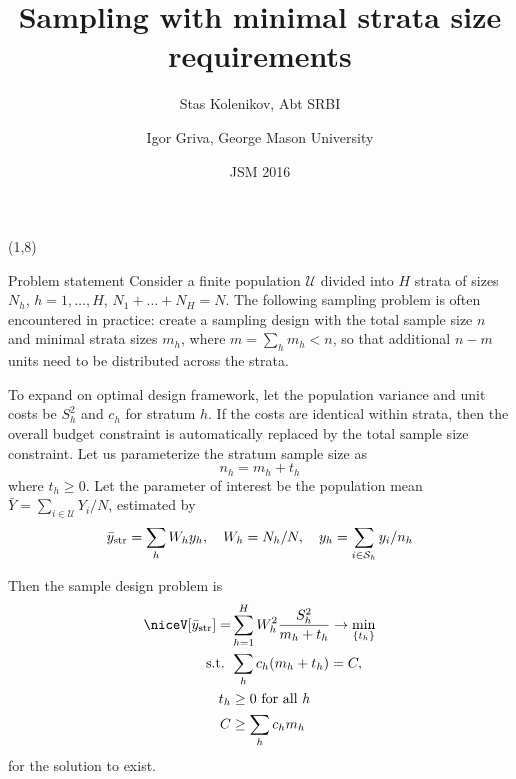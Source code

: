 \documentclass[trans,hyperref={pdfpagelabels=false}]{beamer}
\newcommand{\Var}{\mathop{\niceV}\nolimits}
\begin{document}
\title{Sampling with minimal strata size requirements}

\author{Stas Kolenikov, Abt SRBI
\and
Igor Griva, George Mason University}
\date{JSM 2016}
\institute{}



\begin{frame}{}

\begin{textblock}{26}(1,8)
    \begin{block}{Problem statement}
        \alert<2|trans:0>{
        Consider a finite population $\mathcal U$ divided into $H$ strata
        of sizes $N_h$, $h=1, \ldots, H$, $N_1 + \ldots + N_H = N$.
        The following sampling problem
        is often encountered in practice: create a sampling design
        with the total sample size $n$ and minimal strata sizes $m_h$,
        where $m = \sum_h m_h < n$, so that additional $n-m$ units need to
        be distributed across the strata.}

        \alert<3|trans:0>{
        To expand on  optimal design framework,
        let the population variance and unit costs be
        $S_h^2$ and $c_h$ for stratum $h$. If the costs are identical
        within strata, then the overall budget constraint
        is automatically replaced by the total sample size constraint.
        Let us parameterize the stratum sample size as
        \begin{equation}
            \label{eq:stratum:size}
            n_h = m_h + t_h
        \end{equation}
        where $t_h\ge 0$. Let the parameter of interest be the
        population mean $\bar Y = \sum_{i \in \mathcal U} Y_i/N$,
        estimated by
        \begin{equation}
            \bar y_{\rm str} = \sum_h W_h y_h,
            \quad W_h = N_h/N,
            \quad y_h = \sum_{i \in \mathcal S_h} y_i/n_h
        \end{equation}
        }

        \alert<4|trans:0>{
        Then the sample design problem is
        \begin{align}
            \Var[ \bar y_{\rm str}]
               = & \sum_{h=1}^H W_h^2 \frac{S_h^2}{m_h + t_h}
               \to \min_{\{ t_h \}}
            \label{eq:design:optimization}
            \\
            \mbox{s.t. } & \sum_h c_h (m_h + t_h) = C,
            \label{eq:design:budget}
            \\
            t_h & \ge 0 \mbox{ for all } h
            \label{eq:design:thge0}
            \\
            C & \ge \sum_h c_h m_h
            \label{eq:budget:interesting}
        \end{align}
        for the solution to exist.
        }


\end{block}
\end{textblock}
\end{frame}
\end{document}
